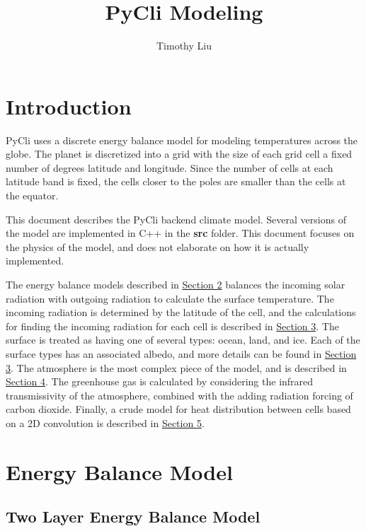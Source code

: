 \documentclass[12pt]{article} %
\title{PyCli Modeling}
\author{Timothy Liu}
\begin{document}
\maketitle

\tableofcontents

\newpage

\section{Introduction}
PyCli uses a discrete energy balance model for modeling temperatures across the globe. The planet is discretized into a grid with the size of each grid cell a fixed number of degrees latitude and longitude. Since the number of cells at each latitude band is fixed, the cells closer to the poles are smaller than the cells at the equator.

This document describes the PyCli backend climate model. Several versions of the model are implemented in C++ in the \textbf{src} folder. This document focuses on the physics of the model, and does not elaborate on how it is actually implemented.

The energy balance models described in \hyperref[sec:model]{Section 2} balances the incoming solar radiation with outgoing radiation to calculate the surface temperature. The incoming radiation is determined by the latitude of the cell, and the calculations for finding the incoming radiation for each cell is described in \hyperref[sec:radiation]{Section 3}.  The surface is treated as having one of several types: ocean, land, and ice. Each of the surface types has an associated albedo, and more details can be found in \hyperref[sec:surface]{Section 3}. The atmosphere is the most complex piece of the model, and is described in \hyperref[sec:atmos]{Section 4}. The greenhouse gas is calculated by considering the infrared transmissivity of the atmosphere, combined with the adding radiation forcing of carbon dioxide. Finally, a crude model for heat distribution between cells based on a 2D convolution is described in \hyperref[sec:heatflow]{Section 5}.

\newpage
\section{Energy Balance Model}
\label{sec:model}

\subsection{Two Layer Energy Balance Model}
\end{document}
